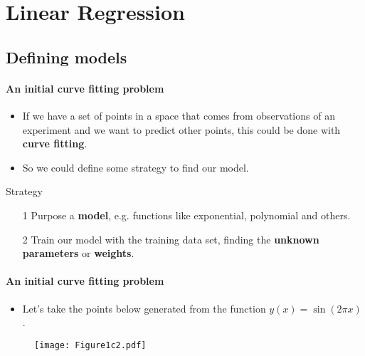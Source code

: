 \section{Linear Regression}\label{sec:linear-regression}
\framecard{\insertsection}
\subsection{Defining models}

\begin{frame}{\insertsubsection}
	\framesubtitle{An initial curve fitting problem}

\begin{itemize}
	\item If we have a set of points in a space that comes from observations of an experiment and we want to predict other points, this could be done with \textbf{\textcolor{UniOrange}{curve fitting}}.
	\item So we could define some strategy to find our model.
\end{itemize}

\begin{block}{Strategy}
	\begin{itemize}
		\item[1] Purpose a \textcolor{UniBlue}{\textbf{model}}, e.g. functions like exponential, polynomial and others.
		\item[2] Train our model with the training data set, finding the \textcolor{UniBlue}{\textbf{unknown parameters}} or \textcolor{UniBlue}{\textbf{weights}}.
	\end{itemize}
\end{block}
\end{frame}


\begin{frame}{\insertsubsection}
	\framesubtitle{An initial curve fitting problem}
	\begin{itemize}
		\item Let's take the points below generated from the function $y(x)=\sin (2\pi x)$.
	\end{itemize}

	\begin{figure}
	\label{fig:plot-fitting-example}
		\texttt{[image: Figure1c2.pdf]}
	\end{figure}
\end{frame}

